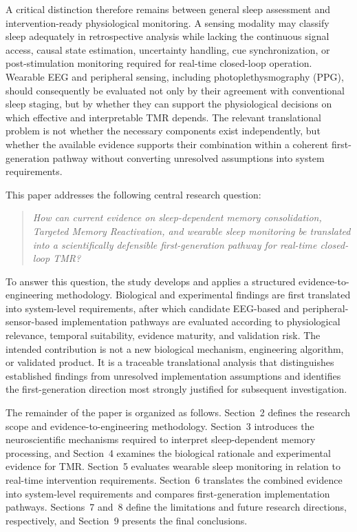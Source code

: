 A critical distinction therefore remains between general sleep assessment and
intervention-ready physiological monitoring. A sensing modality may classify
sleep adequately in retrospective analysis while lacking the continuous signal
access, causal state estimation, uncertainty handling, cue synchronization, or
post-stimulation monitoring required for real-time closed-loop operation.
Wearable EEG and peripheral sensing, including photoplethysmography (PPG), should
consequently be evaluated not only by their agreement with conventional sleep
staging, but by whether they can support the physiological decisions on which
effective and interpretable TMR depends. The relevant translational problem is
not whether the necessary components exist independently, but whether the
available evidence supports their combination within a coherent
first-generation pathway without converting unresolved assumptions into system
requirements.

This paper addresses the following central research question:

\begin{quote}
\textit{How can current evidence on sleep-dependent memory consolidation,
Targeted Memory Reactivation, and wearable sleep monitoring be translated into
a scientifically defensible first-generation pathway for real-time closed-loop
TMR?}
\end{quote}

To answer this question, the study develops and applies a structured
evidence-to-engineering methodology. Biological and experimental findings are
first translated into system-level requirements, after which candidate
EEG-based and peripheral-sensor-based implementation pathways are evaluated
according to physiological relevance, temporal suitability, evidence maturity,
and validation risk. The intended contribution is not a new biological
mechanism, engineering algorithm, or validated product. It is a traceable
translational analysis that distinguishes established findings from unresolved
implementation assumptions and identifies the first-generation direction most
strongly justified for subsequent investigation.

The remainder of the paper is organized as follows. Section~2 defines the
research scope and evidence-to-engineering methodology. Section~3 introduces the
neuroscientific mechanisms required to interpret sleep-dependent memory
processing, and Section~4 examines the biological rationale and experimental
evidence for TMR. Section~5 evaluates wearable sleep monitoring in relation to
real-time intervention requirements. Section~6 translates the combined evidence
into system-level requirements and compares first-generation implementation
pathways. Sections~7 and~8 define the limitations and future research
directions, respectively, and Section~9 presents the final conclusions.